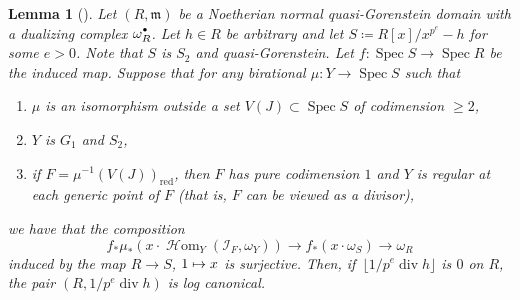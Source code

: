 \documentclass[JEP,XML,SOM,Unicode,published]{cedram}
\newcommand\mto{\mathchoice{\longmapsto}{\mapsto}{\mapsto}{\mapsto}}
\newcommand{\sbullet}{{\scriptscriptstyle\bullet}}
\newcommand{\csbullet}{{\raisebox{1pt}{$\sbullet$}}}
\theoremstyle{plain}
\newtheorem{lemma}[theorem]{Lemma}
\theoremstyle{definition}
\numberwithin{equation}{theorem}
\newcommand{\fram}{\mathfrak{m}}
\DeclareMathOperator{\Div}{{div}}
\DeclareMathOperator{\sHom}{{\sH}om}
\DeclareMathOperator{\red}{red}
\DeclareMathOperator{\Spec}{{Spec}}
\newcommand{\sH}{\mathcal{H}}
\newcommand{\sI}{\mathcal{I}}
\newcommand{\unpe}{{1/{p^e}}}
\newcommand{\pe}{{p^e}}
\newcommand{\inv}{^{-1}}
\begin{document}
\begin{lemma}[{\cf \cite[Prop.\,5.15]{BMPSTWWPerfectoidPure}}]\label{lemma lcness can be tested from S}
Let $(R,\fram)$ be a Noetherian normal quasi-Gorenstein domain with a dualizing complex $\omega_R^\csbullet$. Let $h\in R$ be arbitrary and let $S\coloneqq R[x]/x^\pe-h$ for some $e>0$. Note that $S$ is $S_2$ and quasi-Gorenstein.
Let $f\colon \Spec S\to \Spec R$ be the induced map. Suppose that for any birational $\mu\colon Y\to \Spec S$ such that
\begin{enumerate}
\item $\mu$ is an isomorphism outside a set $V(J)\subset \Spec S$ of codimension $\geq 2$,
\item $Y$ is $G_1$ and $S_2$,
\item if $F=\mu\inv(V(J))_{\red}$, then $F$ has pure codimension $1$ and $Y$ is regular at each generic point of $F$ (that is, $F$ can be viewed as a divisor),
\end{enumerate}
we have that the composition
\begin{equation}\label{map omegay(F) to omega(R) via x}
f_*\mu_*( x\cdot \sHom_Y(\sI_F,\omega_Y)) \to f_* (x\cdot \omega_S) \to \omega_R
\end{equation}
induced by the map $R\to S$, $1\mto x$ is surjective.
Then, if~$\lfloor \unpe\Div h \rfloor$ is $0$ on $R$, the pair $(R,\unpe \Div h)$ is log canonical.
\end{lemma}
\end{document}
